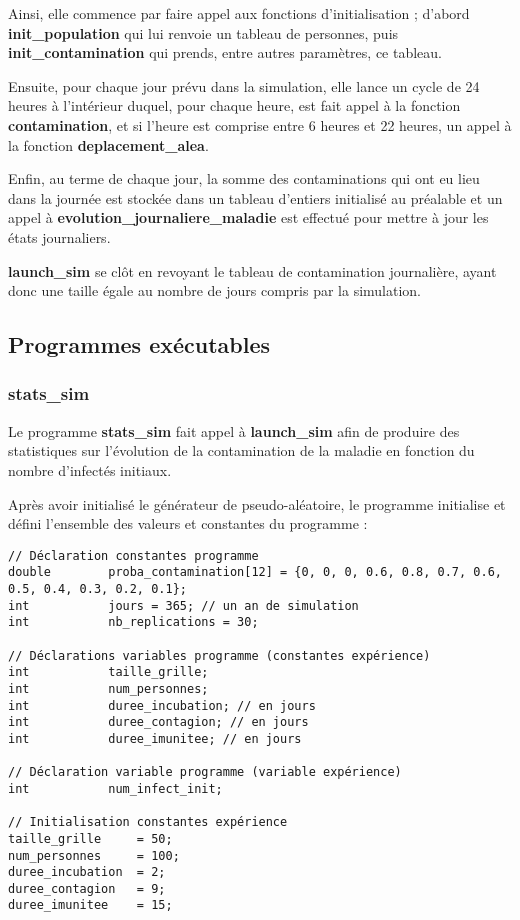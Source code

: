 \documentclass[12pt,french,titlepage]{article}
\begin{document}
Ainsi, elle commence par faire appel aux fonctions d'initialisation ; d'abord \textbf{init\_population} qui lui renvoie un tableau de personnes, puis \textbf{init\_contamination} qui prends, entre autres paramètres, ce tableau.

Ensuite, pour chaque jour prévu dans la simulation, elle lance un cycle de 24 heures à l'intérieur duquel, pour chaque heure, est fait appel à la fonction \textbf{contamination}, et si l'heure est comprise entre 6 heures et 22 heures, un appel à la fonction \textbf{deplacement\_alea}.

Enfin, au terme de chaque jour, la somme des contaminations qui ont eu lieu dans la journée est stockée dans un tableau d'entiers initialisé au préalable et un appel à  \textbf{evolution\_journaliere\_maladie} est effectué pour mettre à jour les états journaliers.

\textbf{launch\_sim} se clôt en revoyant le tableau de contamination journalière, ayant donc une taille égale au nombre de jours compris par la simulation.

\newpage

\subsection{Programmes exécutables}
\subsubsection{stats\_sim}
Le programme \textbf{stats\_sim} fait appel à \textbf{launch\_sim} afin de produire des statistiques sur l'évolution de la contamination de la maladie en fonction du nombre d'infectés initiaux.

Après avoir initialisé le générateur de pseudo-aléatoire, le programme initialise et défini l'ensemble des valeurs et constantes du programme :
\begin{lstlisting}
// Déclaration constantes programme
double        proba_contamination[12] = {0, 0, 0, 0.6, 0.8, 0.7, 0.6, 0.5, 0.4, 0.3, 0.2, 0.1};
int           jours = 365; // un an de simulation
int           nb_replications = 30;

// Déclarations variables programme (constantes expérience)
int           taille_grille;
int           num_personnes;
int           duree_incubation; // en jours
int           duree_contagion; // en jours
int           duree_imunitee; // en jours

// Déclaration variable programme (variable expérience)
int           num_infect_init;

// Initialisation constantes expérience
taille_grille     = 50;
num_personnes     = 100;
duree_incubation  = 2;
duree_contagion   = 9;
duree_imunitee    = 15;
\end{lstlisting}
\end{document}
